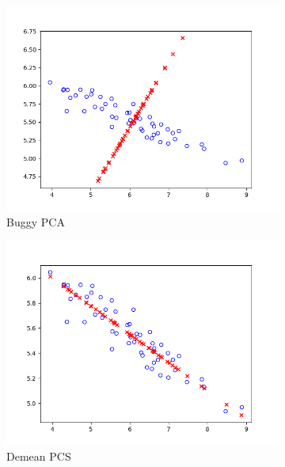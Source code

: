 \documentclass[a4paper]{article}
\theoremstyle{definition}
\newenvironment{soln}{
    \leavevmode\color{blue}\ignorespaces
}{}
\begin{document}
\begin{itemize}
\begin{soln}
    \begin{figure}[h]
        \centering
        \begin{subfigure}{0.5\textwidth}
            \centering
            \includegraphics[width=1.1\linewidth]{buggy2D.png}
            \caption{Buggy PCA}
        \label{fig:3a}
        \end{subfigure}%
        \begin{subfigure}{0.5\textwidth}
            \centering
            \includegraphics[width=1.1\linewidth]{demean2D.png}
            \caption{Demean PCS}
        \label{fig:3b}
        \end{subfigure}
        \begin{subfigure}{0.5\textwidth}

\end{subfigure}
\end{figure}
\end{soln}
\end{itemize}
\end{document}
